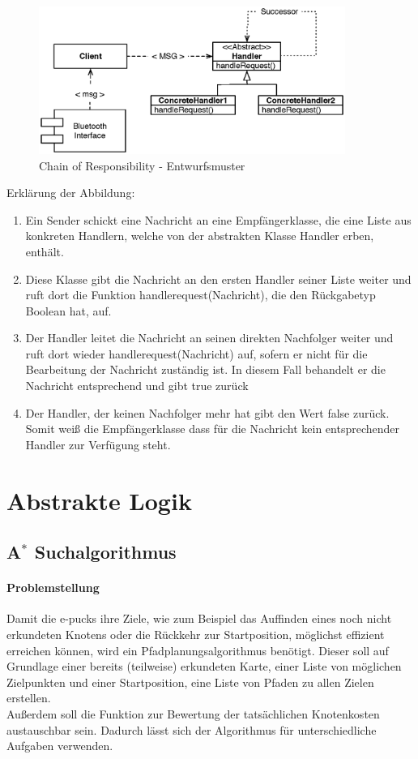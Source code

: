 \documentclass[10pt,a4paper]{article}
\begin{document}
			\begin{figure}[h]
				\centering
				\includegraphics[width=10cm]{images/android_handler.eps}
  				\caption{Chain of Responsibility - Entwurfsmuster}
  			\end{figure}	
  			Erklärung der Abbildung:
   			\begin{enumerate}
  				\item Ein Sender schickt eine Nachricht an eine Empfängerklasse, die eine Liste aus konkreten Handlern,
  					welche von der abstrakten Klasse Handler erben, enthält.
  				\item Diese Klasse gibt die Nachricht an den ersten Handler seiner Liste weiter und ruft dort die Funktion handlerequest(Nachricht),
  					die den Rückgabetyp Boolean hat, auf.
  				\item Der Handler leitet die Nachricht an seinen direkten Nachfolger weiter und ruft dort wieder handlerequest(Nachricht) auf, sofern
  					er nicht für die Bearbeitung der Nachricht zuständig ist. In diesem Fall behandelt er die Nachricht entsprechend und gibt true zurück
  				\item Der Handler, der keinen Nachfolger mehr hat gibt den Wert false zurück. Somit weiß die Empfängerklasse dass für die Nachricht kein
  					entsprechender Handler zur Verfügung steht.  					
  			\end{enumerate}   

	\section{Abstrakte Logik}

	\subsection{A$^\ast$ Suchalgorithmus}
		\label{subsec:astern}
		\paragraph{Problemstellung}
			Damit die e-pucks ihre Ziele, wie zum Beispiel das Auffinden eines noch nicht erkundeten Knotens oder die 
			Rückkehr zur Startposition, möglichst effizient erreichen können, wird ein Pfadplanungsalgorithmus benötigt. 
			Dieser soll auf Grundlage einer bereits (teilweise) erkundeten Karte, einer Liste von möglichen Zielpunkten 
			und einer Startposition, eine Liste von Pfaden zu allen Zielen erstellen.\\
			Außerdem soll die Funktion zur Bewertung der tatsächlichen Knotenkosten austauschbar sein. Dadurch lässt 
			sich der Algorithmus für unterschiedliche Aufgaben verwenden.
\end{document}

